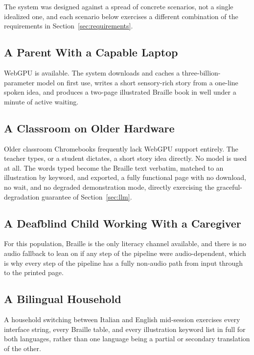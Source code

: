 \documentclass[conference]{IEEEtran}
\begin{document}
The system was designed against a spread of concrete scenarios, not a single idealized one, and each scenario below exercises a different combination of the requirements in Section~\ref{sec:requirements}.

\subsection{A Parent With a Capable Laptop}

WebGPU is available. The system downloads and caches a three-billion-parameter model on first use, writes a short sensory-rich story from a one-line spoken idea, and produces a two-page illustrated Braille book in well under a minute of active waiting.

\subsection{A Classroom on Older Hardware}

Older classroom Chromebooks frequently lack WebGPU support entirely. The teacher types, or a student dictates, a short story idea directly. No model is used at all. The words typed become the Braille text verbatim, matched to an illustration by keyword, and exported, a fully functional page with no download, no wait, and no degraded demonstration mode, directly exercising the graceful-degradation guarantee of Section~\ref{sec:llm}.

\subsection{A Deafblind Child Working With a Caregiver}

For this population, Braille is the only literacy channel available, and there is no audio fallback to lean on if any step of the pipeline were audio-dependent, which is why every step of the pipeline has a fully non-audio path from input through to the printed page.

\subsection{A Bilingual Household}

A household switching between Italian and English mid-session exercises every interface string, every Braille table, and every illustration keyword list in full for both languages, rather than one language being a partial or secondary translation of the other.
\end{document}
